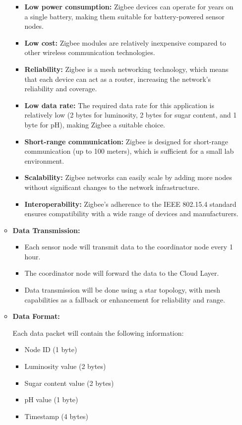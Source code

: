 \documentclass{article}
\begin{document}
\begin{enumerate}
\begin{itemize}
\begin{itemize}
    \item \textbf{Low power consumption:} Zigbee devices can operate for years on a single battery, making them suitable for battery-powered sensor nodes.
    \item \textbf{Low cost:} Zigbee modules are relatively inexpensive compared to other wireless communication technologies.
    \item \textbf{Reliability:} Zigbee is a mesh networking technology, which means that each device can act as a router, increasing the network's reliability and coverage.
    \item \textbf{Low data rate:} The required data rate for this application is relatively low (2 bytes for luminosity, 2 bytes for sugar content, and 1 byte for pH), making Zigbee a suitable choice.
    \item \textbf{Short-range communication:} Zigbee is designed for short-range communication (up to 100 meters), which is sufficient for a small lab environment.
    \item \textbf{Scalability:} Zigbee networks can easily scale by adding more nodes without significant changes to the network infrastructure.
    \item \textbf{Interoperability:} Zigbee's adherence to the IEEE 802.15.4 standard ensures compatibility with a wide range of devices and manufacturers.
\end{itemize}

\item \textbf{Data Transmission:}

\begin{itemize}
    \item Each sensor node will transmit data to the coordinator node every 1 hour.
    \item The coordinator node will forward the data to the Cloud Layer.
    \item Data transmission will be done using a star topology, with mesh capabilities as a fallback or enhancement for reliability and range.
\end{itemize}

\item \textbf{Data Format:}

Each data packet will contain the following information:
\begin{itemize}
    \item Node ID (1 byte)
    \item Luminosity value (2 bytes)
    \item Sugar content value (2 bytes)
    \item pH value (1 byte)
    \item Timestamp (4 bytes)
\end{itemize}


\end{itemize}
\end{enumerate}
\end{document}
